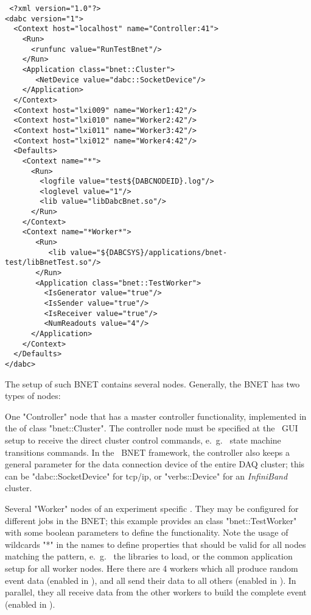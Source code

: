 \begin{small}
\begin{verbatim}
 <?xml version="1.0"?>
<dabc version="1">
  <Context host="localhost" name="Controller:41">
    <Run>
      <runfunc value="RunTestBnet"/>
    </Run>
    <Application class="bnet::Cluster">
       <NetDevice value="dabc::SocketDevice"/>
    </Application>
  </Context>
  <Context host="lxi009" name="Worker1:42"/>
  <Context host="lxi010" name="Worker2:42"/>
  <Context host="lxi011" name="Worker3:42"/>
  <Context host="lxi012" name="Worker4:42"/>
  <Defaults>
    <Context name="*">
      <Run>
        <logfile value="test${DABCNODEID}.log"/>
        <loglevel value="1"/>
        <lib value="libDabcBnet.so"/>
      </Run>
    </Context>
    <Context name="*Worker*">
       <Run>
          <lib value="${DABCSYS}/applications/bnet-test/libBnetTest.so"/>
       </Run>
       <Application class="bnet::TestWorker">
         <IsGenerator value="true"/>
         <IsSender value="true"/>
         <IsReceiver value="true"/>
         <NumReadouts value="4"/>
      </Application>       
    </Context>
  </Defaults>
</dabc>
\end{verbatim}
\end{small}

The setup of such BNET contains several  nodes. Generally, the
BNET has two types of nodes: 
\bbul
\item One "Controller" node that has a master
controller functionality, implemented in the  of
class "bnet::Cluster". The controller node must be specified at the \dabc\ GUI setup
to receive the direct cluster control commands, e.~g.~ state machine transitions commands. In the \dabc\ BNET framework, the controller also keeps a general
parameter  for the data connection device of the entire DAQ cluster;
this can be "dabc::SocketDevice" for tcp/ip, or "verbs::Device" for an {\em InfiniBand}
cluster.

\item Several "Worker" nodes of an experiment specific . They
may be configured for different jobs in the BNET; this example provides
an  class "bnet::TestWorker" with some boolean parameters
to define the functionality.
\ebul 
Note the usage of wildcards "*" in the  names to define
properties that should be valid for all nodes matching the pattern, e.~g.~
the libraries to load, or the common application setup for all worker nodes.
Here there are 4 workers which all produce random event data (enabled in ),
and all send their data to all others (enabled in ). In parallel,
they all receive data from the other workers to build the complete event
(enabled in ).

